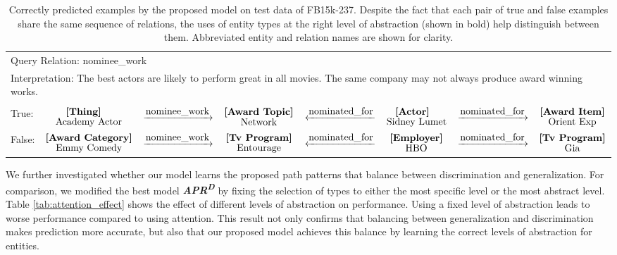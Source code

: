 \documentclass[letterpaper]{article} %
\begin{document}
\begin{table}[h]
{\begin{tabular}{lccccccc}
\midrule
\multicolumn{8}{l}{Query Relation: nominee\_work}\\
\multicolumn{8}{l}{Interpretation: The best actors are likely to perform great in all movies. The same company may not always produce award winning works.}\\
&&&&&&&\\
True:&$\overset{\scalebox{1}{\textbf{[Thing]}}}{\text{Academy Actor}}$&$\xrightarrow{\scalebox{1}{nominee\_work}}$&$\overset{\scalebox{1}{\textbf{[Award Topic]}}}{\text{Network}}$&$\xleftarrow{\scalebox{1}{nominated\_for}}$&$\overset{\scalebox{1}{\textbf{[Actor]}}}{\text{Sidney Lumet}}$&$\xrightarrow{\scalebox{1}{nominated\_for}}$&$\overset{\scalebox{1}{\textbf{[Award Item]}}}{\text{Orient Exp}}$\\
False:&$\overset{\scalebox{1}{\textbf{[Award Category]}}}{\text{Emmy Comedy}}$&$\xrightarrow{\scalebox{1}{nominee\_work}}$&$\overset{\scalebox{1}{\textbf{[Tv Program]}}}{\text{Entourage}}$&$\xleftarrow{\scalebox{1}{nominated\_for}}$&$\overset{\scalebox{1}{\textbf{[Employer]}}}{\text{HBO}}$&$\xrightarrow{\scalebox{1}{nominated\_for}}$&$\overset{\scalebox{1}{\textbf{[Tv Program]}}}{\text{Gia}}$\\
\bottomrule
\end{tabular}}
\caption{Correctly predicted examples by the proposed model on test data of FB15k-237. Despite the fact that each pair of true and false examples share the same sequence of relations, the uses of entity types at the right level of abstraction (shown in bold) help distinguish between them. Abbreviated entity and relation names are shown for clarity.}
\label{tab:qualitative_result}
\end{table}

We further investigated whether our model learns the proposed path patterns that balance between discrimination and generalization. For comparison, we modified the best model \textit{\textbf{APR\textsuperscript{D}}} by fixing the selection of types to either the most specific level or the most abstract level. Table \ref{tab:attention_effect} shows the effect of different levels of abstraction on performance. Using a fixed level of abstraction leads to worse performance compared to using attention. This result not only confirms that balancing between generalization and discrimination makes prediction more accurate, but also that our proposed model achieves this balance by learning the correct levels of abstraction for entities.
\end{document}
